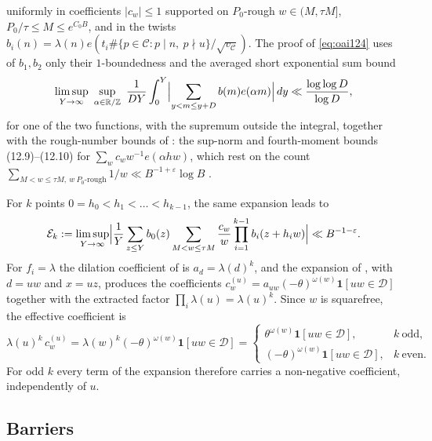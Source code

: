 uniformly in coefficients $|c_w|\le1$ supported on $P_0$-rough $w\in(M,\tau M]$, $P_0/\tau\le M\le e^{C_0B}$, and in the twists $b_i(n)=\lambda(n)e(t_i\#\{p\in\mathcal C:p\mid n,\ p\nmid u\}/\sqrt{v_{\mathcal C}})$. The proof of \eqref{eq:oai124} \cite[pp.~53--55]{OpenAI2026} uses of $b_1,b_2$ only their $1$-boundedness and the averaged short exponential sum bound \cite[Theorem~12.2 and (12.7), pp.~51--52]{OpenAI2026}
\begin{equation}
\limsup_{Y\to\infty}\ \sup_{\alpha\in\mathbb R/\mathbb Z}\ \frac1{DY}\int_0^Y\Bigl|\sum_{y<m\le y+D}b(m)e(\alpha m)\Bigr|\,dy\ll\frac{\log\log D}{\log D},
\label{eq:oai127}
\end{equation}
for one of the two functions, with the supremum outside the integral, together with the rough-number bounds of \cite[Lemma~12.3, p.~52]{OpenAI2026}: the sup-norm and fourth-moment bounds (12.9)--(12.10) for $\sum_wc_ww^{-1}e(\alpha hw)$, which rest on the count $\sum_{M<w\le\tau M,\ w\ P_0\text{-rough}}1/w\ll B^{-1+\varepsilon}\log B$ \cite[(12.13), p.~53]{OpenAI2026}.

For $k$ points $0=h_0<h_1<\dots<h_{k-1}$, the same expansion leads to
\begin{equation}
\mathcal E_k:=\limsup_{Y\to\infty}\Bigl|\frac1Y\sum_{z\le Y}b_0(z)\sum_{M<w\le\tau M}\frac{c_w}{w}\prod_{i=1}^{k-1}b_i(z+h_iw)\Bigr|\ll B^{-1-\varepsilon}.
\label{eq:E_k}
\end{equation}
For $f_i=\lambda$ the dilation coefficient of \cite[Lemma~11.3]{OpenAI2026} is $a_d=\lambda(d)^k$, and the expansion of \cite[\S12.1]{OpenAI2026}, with $d=uw$ and $x=uz$, produces the coefficients $c^{(u)}_w=a_{uw}(-\theta)^{\omega(w)}\mathbf 1[uw\in\mathcal D]$ together with the extracted factor $\prod_i\lambda(u)=\lambda(u)^k$. Since $w$ is squarefree, the effective coefficient is
\begin{equation}
\lambda(u)^k\,c^{(u)}_w=\lambda(w)^k(-\theta)^{\omega(w)}\mathbf 1[uw\in\mathcal D]=
\begin{cases}\theta^{\omega(w)}\mathbf 1[uw\in\mathcal D],&k\ \text{odd},\\ (-\theta)^{\omega(w)}\mathbf 1[uw\in\mathcal D],&k\ \text{even}.\end{cases}
\label{eq:cw_general}
\end{equation}
For odd $k$ every term of the expansion therefore carries a non-negative coefficient, independently of $u$.

\subsection{Barriers}
\label{subsec:barrier}

